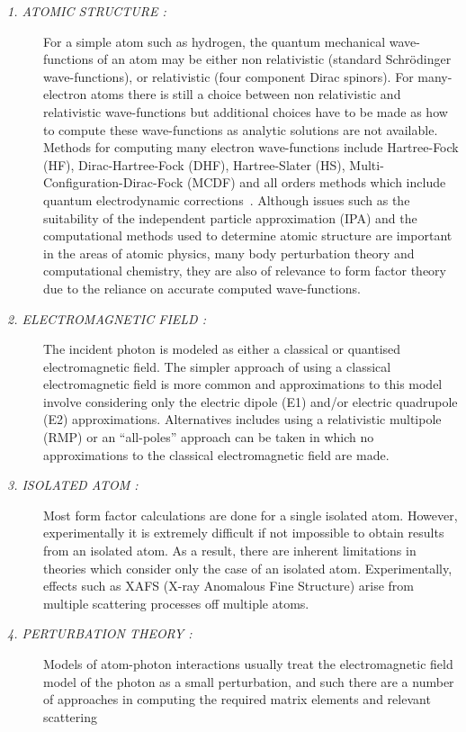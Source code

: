 \begin{description}
    \item[\it 1. ATOMIC STRUCTURE :] 
    For a simple atom such as hydrogen, the quantum
    mechanical wave-functions of an atom may be either non relativistic (standard
    Schr\"odinger wave-functions), or relativistic (four component Dirac
    spinors). For many-electron atoms there is still a choice between non
    relativistic and relativistic wave-functions but additional choices have
    to be made as how to compute these wave-functions as analytic solutions
    are not available. Methods for computing many electron wave-functions include
    Hartree-Fock (HF), Dirac-Hartree-Fock (DHF), Hartree-Slater (HS), 
    Multi-Configuration-Dirac-Fock
    (MCDF) and all orders methods which include quantum electrodynamic
    corrections~\cite{Sapirstein}. Although issues such as the suitability of the
    independent particle approximation (IPA) and the computational methods used
    to determine atomic structure are important in the areas of atomic physics,
    many body perturbation theory and computational chemistry, they are also of
    relevance to form factor theory due to the reliance on accurate
    computed wave-functions.
    \item[\it 2. ELECTROMAGNETIC FIELD :]
    The incident photon is modeled as either a classical or quantised
    electromagnetic field. The simpler approach of using a classical
    electromagnetic field is more common and approximations to this model
    involve considering only the electric dipole (E1) and/or electric quadrupole
    (E2) approximations. Alternatives includes using a relativistic multipole
    (RMP) or an ``all-poles'' approach can be taken in
    which no approximations to the classical electromagnetic field are made.
    \item[\it 3. ISOLATED ATOM :]
    Most form factor calculations are done for a single isolated atom. However,
    experimentally it is extremely difficult if not impossible to obtain results
    from an isolated atom. As a result, there are inherent limitations in
    theories which consider only the case of an isolated atom. Experimentally,
    effects such as XAFS (X-ray Anomalous Fine Structure) arise from multiple
    scattering processes off multiple atoms.
    \item[\it 4. PERTURBATION THEORY :]
    Models of atom-photon interactions usually treat the electromagnetic field
    model of the photon as a small perturbation, and such there are a number of
    approaches in computing the required matrix elements and relevant scattering

\end{description}
